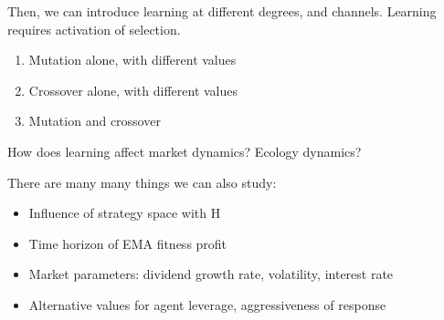 \documentclass{article}
\begin{document}
Then, we can introduce learning at different degrees, and channels. Learning requires activation of selection.

\begin{enumerate}
    \item Mutation alone, with different values
    \item Crossover alone, with different values
    \item Mutation and crossover
\end{enumerate}

How does learning affect market dynamics? Ecology dynamics?

There are many many things we can also study:
\begin{itemize}
    \item Influence of strategy space with H
    \item Time horizon of EMA fitness profit
    \item Market parameters: dividend growth rate, volatility, interest rate
    \item Alternative values for agent leverage, aggressiveness of response 
\end{itemize}
\end{document}
